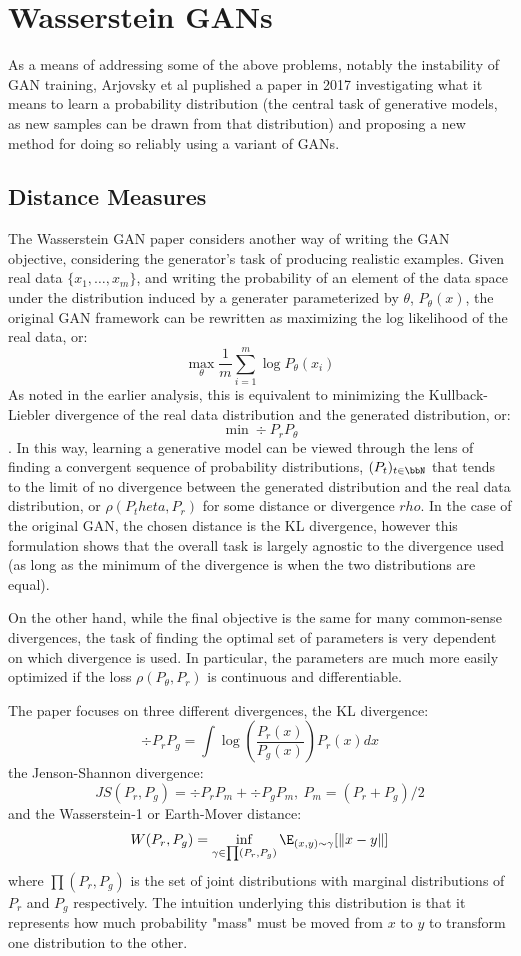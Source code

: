 \section{Wasserstein GANs}

As a means of addressing some of the above problems, notably the instability of GAN training, Arjovsky et al \cite{arjovsky2017wasserstein} puplished a paper in 2017 investigating what it means to learn a probability distribution (the central task of generative models, as new samples can be drawn from that distribution) and proposing a new method for doing so reliably using a variant of GANs.

\subsection{Distance Measures}
The Wasserstein GAN paper considers another way of writing the GAN objective, considering the generator's task of producing realistic examples. Given real data $\{x_1 , \dots, x_m\}$, and writing the probability of an element of the data space under the distribution induced by a generater parameterized by $\theta$, $P_\theta(x)$, the original GAN framework can be rewritten as maximizing the log likelihood of the real data, or:
$$\max_\theta \frac{1}{m} \sum^m_{i=1} \log P_\theta(x_i)$$
As noted in the earlier analysis, this is equivalent to minimizing the Kullback-Liebler divergence of the real data distribution and the generated distribution, or:
$$\min \div{P_r}{P_\theta}$$.
In this way, learning a generative model can be viewed through the lens of finding a convergent sequence of probability distributions, $(P_t)_{t\in \bbN}$ that tends to the limit of no divergence between the generated distribution and the real data distribution, or $\rho(P_theta, P_r)$ for some distance or divergence $rho$. In the case of the original GAN, the chosen distance is the KL divergence, however this formulation shows that the overall task is largely agnostic to the divergence used (as long as the minimum of the divergence is when the two distributions are equal).

On the other hand, while the final objective is the same for many common-sense divergences, the task of finding the optimal set of parameters is very dependent on which divergence is used. In particular, the parameters are much more easily optimized if the loss $\rho(P_\theta,P_r)$ is continuous and differentiable.

The paper focuses on three different divergences, the KL divergence:
$$\div{P_r}{P_g} = \int \log(\frac{P_r(x)}{P_g(x)})P_r(x) dx$$
the Jenson-Shannon divergence:
$$JS(P_r,P_g) = \div{P_r}{P_m} + \div{P_g}{P_m}, \ P_m = (P_r + P_g) / 2$$
and the Wasserstein-1 or Earth-Mover distance:
$$W(P_r, P_g) = \inf_{\gamma \in \prod(P_r,P_g)} \E_{(x,y) \sim \gamma} [\|x - y\|]$$
where $\prod(P_r,P_g)$ is the set of joint distributions with marginal distributions of $P_r$ and $P_g$ respectively. The intuition underlying this distribution is that it represents how much probability "mass" must be moved from $x$ to $y$ to transform one distribution to the other.

